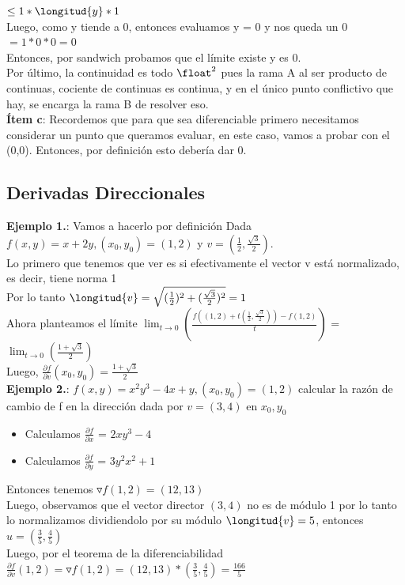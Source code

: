 \documentclass[10pt,a4paper]{article}
\begin{document}
$\le 1 * \longitud{y} * 1$ \\
Luego, como y tiende a 0, entonces evaluamos y = 0 y nos queda un 0 \\
$= 1 * 0 * 0 = 0$ \\
Entonces, por sandwich probamos que el límite existe y es 0. \\
Por último, la continuidad es todo $\float^{2}$ pues la rama A al ser producto de continuas, cociente de continuas es continua, y en el único punto conflictivo que hay, se encarga la rama B de resolver eso. \\
\textbf{Ítem c}: Recordemos que para que sea diferenciable primero necesitamos considerar un punto que queramos evaluar, en este caso, vamos a probar con el (0,0). Entonces, por definición esto debería dar 0.
\subsection*{Derivadas Direccionales}
\label{subsec:derivadas_direccionales_ej}
\textbf{Ejemplo 1.}: Vamos a hacerlo por definición
Dada $f(x,y) = x+2y, (x_{0}, y_{0})=(1,2)$ y $v=(\frac{1}{2}, \frac{\sqrt{3}}{2})$. \\
Lo primero que tenemos que ver es si efectivamente el vector v está normalizado, es decir, tiene norma 1 \\
Por lo tanto $\longitud{v} = \sqrt{(\frac{1}{2})^{2}+ (\frac{\sqrt{3}}{2})^{2}} = 1$ \\
Ahora planteamos el límite $\lim_{t \to 0} \left(\frac{f((1, 2) + t(\frac{1}{2}, \frac{\sqrt{3}}{2})) - f(1, 2)}{t} \right)$ = $\lim_{t \to 0} \left(\frac{1+\sqrt{3}}{2} \right)$ \\
Luego, $\frac{\partial f}{\partial v}(x_{0}, y_{0}) = \frac{1+\sqrt{3}}{2}$ \\
\textbf{Ejemplo 2.}: $f(x,y) = x^{2}y^{3}-4x+y, (x_{0}, y_{0})=(1,2)$ calcular la razón de cambio de f en la dirección dada por $v=(3,4)$ en $x_{0}, y_{0}$
\begin{itemize}
    \item Calculamos $\frac{\partial f}{\partial x}$ = $2xy^{3}-4$
    \item Calculamos $\frac{\partial f}{\partial y}$ = $3y^{2}x^{2}+1$
\end{itemize}
Entonces tenemos $\triangledown f(1,2) = (12, 13)$ \\
Luego, observamos que el vector director $(3,4)$ no es de módulo 1 por lo tanto lo normalizamos dividiendolo por su módulo $\longitud{v} = 5$, entonces $u=(\frac{3}{5}, \frac{4}{5})$ \\
Luego, por el teorema de la diferenciabilidad $\frac{\partial f}{\partial v}(1, 2) = \triangledown f(1,2) = (12, 13) * (\frac{3}{5}, \frac{4}{5}) = \frac{166}{5} $
\end{document}
